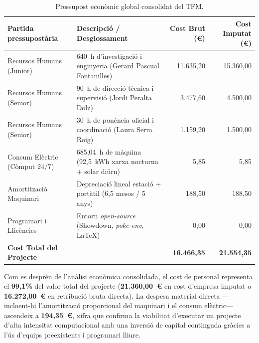 \begin{table}[htbp]
    \centering
    \caption{Pressupost econòmic global consolidat del TFM.}
    \label{tab:cost_consolidat}
    \small
    \begin{tabularx}{\textwidth}{lX rr}
        \toprule
        \textbf{Partida pressupostària} & \textbf{Descripció / Desglossament} & \textbf{Cost Brut (€)} & \textbf{Cost Imputat (€)} \\
        \midrule
        Recursos Humans (Junior)        & 640~h d'investigació i enginyeria (Gerard Pascual Fontanilles) & 11.635,20 & 15.360,00 \\
        Recursos Humans (Senior)        & 90~h de direcció tècnica i supervisió (Jordi Peralta Dolz)     & 3.477,60  & 4.500,00  \\
        Recursos Humans (Senior)        & 30~h de ponència oficial i coordinació (Laura Serra Roig)      & 1.159,20  & 1.500,00  \\
        Consum Elèctric (Còmput 24/7)   & 685,04~h de màquina (92,5~kWh xarxa nocturna $+$ solar diürn)   & 5,85      & 5,85      \\
        Amortització Maquinari          & Depreciació lineal estació + portàtil (6,5 mesos / 5 anys)      & 188,50    & 188,50    \\
        Programari i Llicències         & Entorn \emph{open-source} (Showdown, \textit{poke-env}, \LaTeX{}) & 0,00   & 0,00      \\
        \midrule
        \textbf{Cost Total del Projecte} &                                                                & \textbf{16.466,35} & \textbf{21.554,35} \\
        \bottomrule
    \end{tabularx}
\end{table}

Com es desprèn de l'anàlisi econòmica consolidada, el cost de personal representa el \textbf{99,1\%} del valor total del projecte (\textbf{21.360,00~€} en cost d'empresa imputat o \textbf{16.272,00~€} en retribució bruta directa). La despesa material directa ---incloent-hi l'amortització proporcional del maquinari i el consum elèctric--- ascendeix a \textbf{194,35~€}, xifra que confirma la viabilitat d'executar un projecte d'alta intensitat computacional amb una inversió de capital continguda gràcies a l'ús d'equips preexistents i programari lliure.
